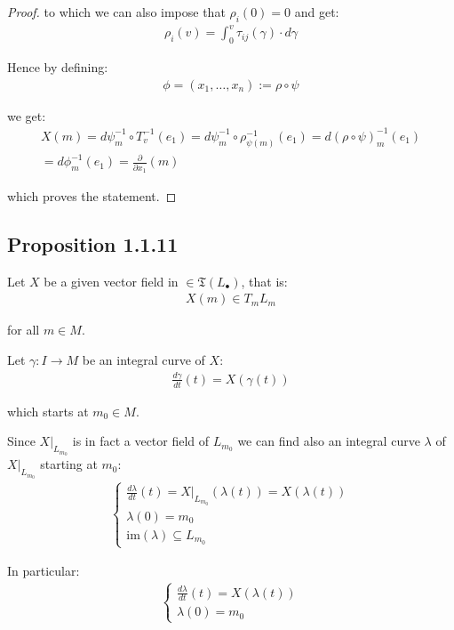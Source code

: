 \begin{proof}
				to which we can also impose that $\rho_i(0) = 0$ and get:
				\begin{align*}
					\rho_i(v) = \int_{0}^{v} \tau_{ij}(\gamma) \cdot d \gamma
				\end{align*}

				Hence by defining:
				\begin{align*}
					\phi = (x_1, \ldots, x_n) := \rho \circ \psi
				\end{align*}

				we get:
				\begin{gather*}
					X(m) = d \psi_m^{-1} \circ T_v^{-1}(e_1) = d \psi_m^{-1} \circ \rho_{\psi(m)}^{-1}(e_1) = d(\rho \circ \psi)_m^{-1}(e_1) \\
					= d \phi^{-1}_m(e_1) = \frac{\partial}{\partial x_1}(m)
				\end{gather*}

				which proves the statement.
		\end{proof}

		\subsection{Proposition 1.1.11}	
		Let $X$ be a given vector field in $\in \mathfrak{T}(L_\bullet)$, that is:
		\begin{align*}
			X(m) \in T_m L_m
		\end{align*}

		for all $m \in M$. \bigskip

		Let $\gamma : I \to M$ be an integral curve of $X$:
		\begin{align*}
			\frac{d \gamma}{dt}(t) = X(\gamma(t))
		\end{align*}

		which starts at $m_0 \in M$. \bigskip

		Since $X|_{L_{m_0}}$ is in fact a vector field of $L_{m_0}$ we can find also an integral curve $\lambda$ of $X|_{L_{m_0}}$ starting at $m_0$:
		\begin{align*}
			\begin{cases}
				\frac{d \lambda}{dt}(t) = X|_{L_{m_0}}(\lambda(t)) = X(\lambda(t)) \\
				\lambda(0) = m_0 \\
				\text{im}(\lambda) \subseteq L_{m_0}
			\end{cases}
		\end{align*}

		In particular:
		\begin{align*}
			\begin{cases}
				\frac{d \lambda}{dt}(t) = X(\lambda(t)) \\
				\lambda(0) = m_0
			\end{cases}
		\end{align*}

